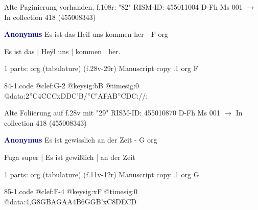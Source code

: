\documentclass[twocolumn]{book}
\begin{document}
\newline Alte Paginierung vorhanden, f.108r: "82"
\newline RISM-ID: 455011004
\newline D-Fh  Ms 001
\newline $\rightarrow$ In collection 418 (455008343)
      
\newline \par \vspace{7pt} \textcolor{darkblue}{\textbf{Anonymus  }}
\newline Es ist das Heil uns kommen her - F
\newline org
\newline \begin{itshape}[f.28v, at left:] Es ist das | Heÿl uns | kommen | her.\end{itshape} 
\newline \textcolor{darkblue}{}  1 parts: org (tabulature)  (f.28v-29r)
\newline Manuscript copy
.1  org  F  
\begin{filecontents*}{84-1.code}
@clef:G-2
@keysig:bB
@timesig:0
@data:2''C4CCCxDDC'B/''C'AFAB''CDC://:
\end{filecontents*}
\newline
%

\newline Alte Foliierung auf f.28v mit "29"
\newline RISM-ID: 455010870
\newline D-Fh  Ms 001
\newline $\rightarrow$ In collection 418 (455008343)
      
\newline \par \vspace{7pt} \textcolor{darkblue}{\textbf{Anonymus  }}
\newline Es ist gewisslich an der Zeit - G
\newline org
\newline \begin{itshape}[f.11v, at left:] Fuga super | Es ist gewißlich | an der Zeit\end{itshape} 
\newline \textcolor{darkblue}{}  1 parts: org (tabulature)  (f.11v-12r)
\newline Manuscript copy
.1  org  G  
\begin{filecontents*}{85-1.code}
@clef:F-4
@keysig:xF
@timesig:0
@data:4,G{8GB}{AGAA}4B{6GGB'xC}{8DECD}
\end{filecontents*}
\newline
%
\end{document}
